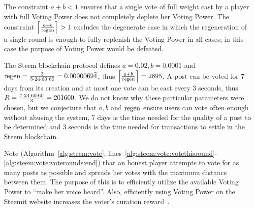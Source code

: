 \begin{remark}
  The constraint $a + b < 1$ ensures that a single vote of full weight cast by a
  player with full Voting Power does not completely deplete her Voting Power.
  The constraint $\ceil*{\frac{a + b}{\regen}} > 1$ excludes the degenerate
  case in which the regeneration of a single round is enough to fully replenish
  the Voting Power in all cases; in this case the purpose of Voting Power would
  be defeated.
\end{remark}

\begin{remark}
  \label{remark:steemitparms}
  The Steem blockchain protocol defines $a = 0.02, b = 0.0001$ and $\regen =
  \frac{3}{5 \cdot 24 \cdot 60 \cdot 60} = 0.0000069\bar{4}$, thus
  $\ceil*{\frac{a + b}{\regen}} = 2895$. A post can be voted for 7 days from its
  creation and at most one vote can be cast every 3 seconds, thus $\rounds =
  \frac{7 \cdot 24 \cdot 60 \cdot 60}{3} = 201600$. We do not know why these
  particular parameters were chosen, but we conjecture that $a, b$ and $\regen$
  ensure users can vote often enough without abusing the system, 7 days is the
  time needed for the quality of a post to be determined and 3 seconds is the
  time needed for transactions to settle in the Steem blockchain.
\end{remark}

\begin{remark}
  Note (Algorithm~\ref{alg:steem:vote},
  lines~\ref{alg:steem:vote:votethisround}-\ref{alg:steem:vote:voterounds:end})
  that an honest player attempts to vote for as many posts as possible and
  spreads her votes with the maximum distance between them. The purpose of this
  is to efficiently utilize the available Voting Power to ``make her voice
  heard''. Also, efficiently using Voting Power on the Steemit website increases
  the voter's curation reward~\cite{curationRewards}.
\end{remark}
